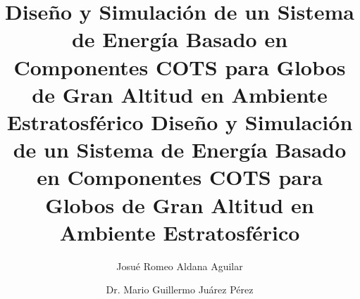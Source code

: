 \title{Diseño y Simulación de un Sistema de Energía Basado en Componentes COTS para Globos de Gran Altitud en Ambiente Estratosférico }

\author{Josué Romeo Aldana Aguilar}

\address{San Salvador, El Salvador}                     %




\maketitle[logo]
\makecopyright

\title{Diseño y Simulación de un Sistema de Energía Basado en Componentes COTS para Globos de Gran Altitud en Ambiente Estratosférico }

\author{Dr. Mario Guillermo Juárez Pérez}

\address{San Salvador, El Salvador}                     %
\maketitle[logo]



